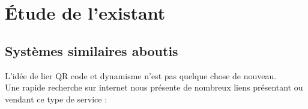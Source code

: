 \documentclass[a4paper,12pt]{article}
\begin{document}
\section{Étude de l'existant}

%

\subsection{Systèmes similaires aboutis}
L'idée de lier QR code et dynamisme n'est pas quelque chose de nouveau.\\
Une rapide recherche sur internet nous présente de nombreux liens présentant ou vendant ce type de service :\\
\end{document}
